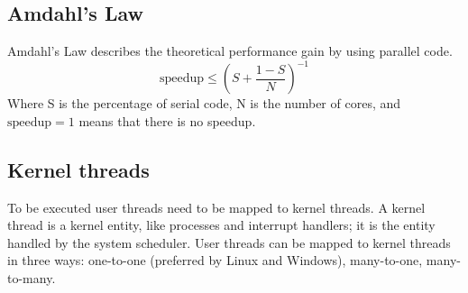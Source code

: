 \subsection{Amdahl's Law}
Amdahl's Law describes the theoretical performance gain by using parallel code.
$$ \text{speedup} \le \left (S+\frac{1-S}{N} \right )^{-1} $$
Where S is the percentage of serial code, N is the number of cores, and $ \text{speedup} = 1 $ means that there is no speedup.

\subsection{Kernel threads}
To be executed user threads need to be mapped to kernel threads. A kernel thread is a kernel entity, like processes and interrupt handlers; it is the entity handled by the system scheduler. User threads can be mapped to kernel threads in three ways: one-to-one (preferred by Linux and Windows), many-to-one, many-to-many.